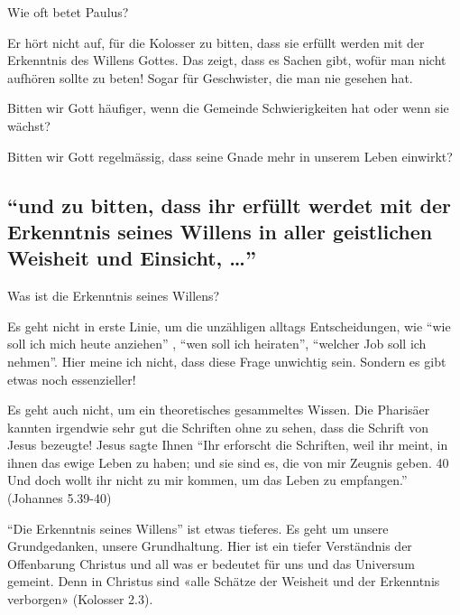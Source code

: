 \documentclass[
  12pt,
]{krantz}
\makeatletter
\newenvironment{kframe}{%
\medskip{}
\setlength{\fboxsep}{.8em}
 \def\at@end@of@kframe{}%
 \ifinner\ifhmode%
  \def\at@end@of@kframe{\end{minipage}}%
  \begin{minipage}{\columnwidth}%
 \fi\fi%
 \def\FrameCommand##1{\hskip\@totalleftmargin \hskip-\fboxsep
 \colorbox{shadecolor}{##1}\hskip-\fboxsep
     \hskip-\linewidth \hskip-\@totalleftmargin \hskip\columnwidth}%
 \MakeFramed {\advance\hsize-\width
   \@totalleftmargin\z@ \linewidth\hsize
   \@setminipage}}%
 {\par\unskip\endMakeFramed%
 \at@end@of@kframe}
\newenvironment{rmdblock}[1]
  {
  \begin{itemize}
  \renewcommand{\labelitemi}{
    \raisebox{-.7\height}[0pt][0pt]{
      {\setkeys{Gin}{width=3em,keepaspectratio}\texttt{[image: img/\#1]}}
    }
  }
  \setlength{\fboxsep}{1em}
  \begin{kframe}
  \item
  }
  {
  \end{kframe}
  \end{itemize}
  }
\newenvironment{rmdquestion}
  {\begin{rmdblock}{question}}
  {\end{rmdblock}}
\makeatother
\begin{document}
Wie oft betet Paulus?

Er hört nicht auf, für die Kolosser zu bitten, dass sie erfüllt werden mit der Erkenntnis des Willens Gottes. Das zeigt, dass es Sachen gibt, wofür man nicht aufhören sollte zu beten! Sogar für Geschwister, die man nie gesehen hat.

\begin{rmdquestion}
Bitten wir Gott häufiger, wenn die Gemeinde Schwierigkeiten hat oder
wenn sie wächst?

Bitten wir Gott regelmässig, dass seine Gnade mehr in unserem Leben
einwirkt?
\end{rmdquestion}

\hypertarget{und-zu-bitten-dass-ihr-erfuxfcllt-werdet-mit-der-erkenntnis-seines-willens-in-aller-geistlichen-weisheit-und-einsicht}{%
\subsection{\texorpdfstring{``und zu bitten, dass ihr erfüllt werdet mit der Erkenntnis seines Willens in aller geistlichen Weisheit und Einsicht, \ldots{}''}{``und zu bitten, dass ihr erfüllt werdet mit der Erkenntnis seines Willens in aller geistlichen Weisheit und Einsicht, \ldots''}}\label{und-zu-bitten-dass-ihr-erfuxfcllt-werdet-mit-der-erkenntnis-seines-willens-in-aller-geistlichen-weisheit-und-einsicht}}

Was ist die Erkenntnis seines Willens?

Es geht nicht in erste Linie, um die unzähligen alltags Entscheidungen, wie ``wie soll ich mich heute anziehen'' , ``wen soll ich heiraten'', ``welcher Job soll ich nehmen''. Hier meine ich nicht, dass diese Frage unwichtig sein. Sondern es gibt etwas noch essenzieller!

Es geht auch nicht, um ein theoretisches gesammeltes Wissen. Die Pharisäer kannten irgendwie sehr gut die Schriften ohne zu sehen, dass die Schrift von Jesus bezeugte! Jesus sagte Ihnen ``Ihr erforscht die Schriften, weil ihr meint, in ihnen das ewige Leben zu haben; und sie sind es, die von mir Zeugnis geben. 40 Und doch wollt ihr nicht zu mir kommen, um das Leben zu empfangen.'' (Johannes 5.39-40)

``Die Erkenntnis seines Willens'' ist etwas tieferes. Es geht um unsere Grundgedanken, unsere Grundhaltung. Hier ist ein tiefer Verständnis der Offenbarung Christus und all was er bedeutet für uns und das Universum gemeint. Denn in Christus sind «alle Schätze der Weisheit und der Erkenntnis verborgen» (Kolosser 2.3).
\end{document}
